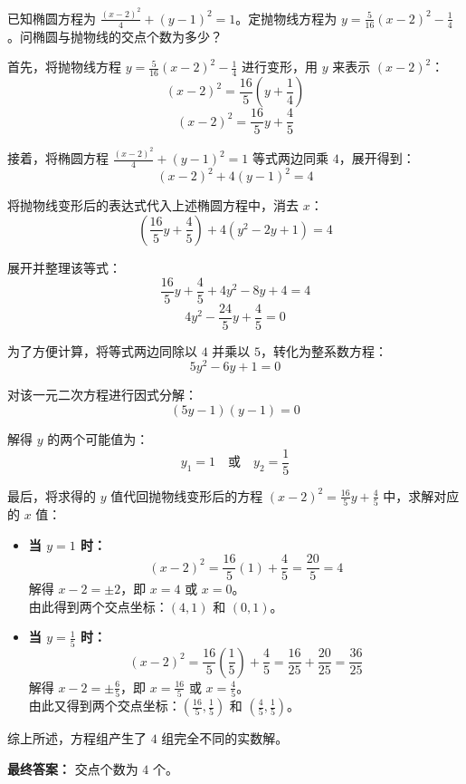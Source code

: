 \documentclass[12pt]{exam}
\begin{document}
\begin{questions}
\question 已知椭圆方程为 $\frac{(x-2)^2}{4} + (y-1)^2 = 1$。定抛物线方程为 $y = \frac{5}{16}(x-2)^2 - \frac{1}{4}$。问椭圆与抛物线的交点个数为多少？
\end{questions}

\begin{answer}
首先，将抛物线方程 $y = \frac{5}{16}(x-2)^2 - \frac{1}{4}$ 进行变形，用 $y$ 来表示 $(x-2)^2$：
\[ (x-2)^2 = \frac{16}{5}\left(y + \frac{1}{4}\right) \]
\[ (x-2)^2 = \frac{16}{5}y + \frac{4}{5} \]

接着，将椭圆方程 $\frac{(x-2)^2}{4} + (y-1)^2 = 1$ 等式两边同乘 $4$，展开得到：
\[ (x-2)^2 + 4(y-1)^2 = 4 \]

将抛物线变形后的表达式代入上述椭圆方程中，消去 $x$：
\[ \left(\frac{16}{5}y + \frac{4}{5}\right) + 4(y^2 - 2y + 1) = 4 \]

展开并整理该等式：
\[ \frac{16}{5}y + \frac{4}{5} + 4y^2 - 8y + 4 = 4 \]
\[ 4y^2 - \frac{24}{5}y + \frac{4}{5} = 0 \]

为了方便计算，将等式两边同除以 $4$ 并乘以 $5$，转化为整系数方程：
\[ 5y^2 - 6y + 1 = 0 \]

对该一元二次方程进行因式分解：
\[ (5y - 1)(y - 1) = 0 \]

解得 $y$ 的两个可能值为：
\[ y_1 = 1 \quad \text{或} \quad y_2 = \frac{1}{5} \]

最后，将求得的 $y$ 值代回抛物线变形后的方程 $(x-2)^2 = \frac{16}{5}y + \frac{4}{5}$ 中，求解对应的 $x$ 值：

\begin{itemize}
    \item \textbf{当 $y = 1$ 时：}
    \[ (x-2)^2 = \frac{16}{5}(1) + \frac{4}{5} = \frac{20}{5} = 4 \]
    解得 $x - 2 = \pm 2$，即 $x = 4$ 或 $x = 0$。\\
    由此得到两个交点坐标：$(4, 1)$ 和 $(0, 1)$。

    \item \textbf{当 $y = \frac{1}{5}$ 时：}
    \[ (x-2)^2 = \frac{16}{5}\left(\frac{1}{5}\right) + \frac{4}{5} = \frac{16}{25} + \frac{20}{25} = \frac{36}{25} \]
    解得 $x - 2 = \pm \frac{6}{5}$，即 $x = \frac{16}{5}$ 或 $x = \frac{4}{5}$。\\
    由此又得到两个交点坐标：$\left(\frac{16}{5}, \frac{1}{5}\right)$ 和 $\left(\frac{4}{5}, \frac{1}{5}\right)$。
\end{itemize}

综上所述，方程组产生了 $4$ 组完全不同的实数解。

\textbf{最终答案：} 交点个数为 $4$ 个。
\end{answer}
\end{document}
